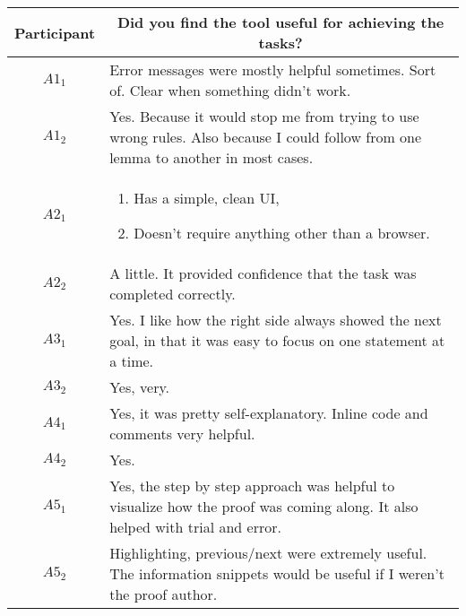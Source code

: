 \clearpage

\noindent
\begin{tabularx}{\linewidth}{@{}cX@{}}
  \toprule
  Participant & \multicolumn{1}{c}{
    \textbf{Did you find the tool useful for achieving the tasks?}
  } \\ \midrule
  $A1_{1}$ & Error messages were mostly helpful sometimes. Sort of. Clear when something didn't work. \\
  $A1_{2}$ & Yes.  Because it would stop me from trying to use wrong rules.  Also because I could follow from one lemma to another in most cases. \\
  $A2_{1}$ & \begin{enumerate} \item Has a simple, clean UI, \item Doesn't require anything other than a browser. \end{enumerate} \\
  $A2_{2}$ & A little.  It provided confidence that the task was completed correctly. \\
  $A3_{1}$ & Yes.  I like how the right side always showed the next goal, in that it was easy to focus on one statement at a time. \\
  $A3_{2}$ & Yes, very. \\
  $A4_{1}$ & Yes, it was pretty self-explanatory.  Inline code and comments very helpful. \\
  $A4_{2}$ & Yes. \\
  $A5_{1}$ & Yes, the step by step approach was helpful to visualize how the proof was coming along.  It also helped with trial and error. \\
  $A5_{2}$ & Highlighting, previous/next were extremely useful.  The information snippets would be useful if I weren't the proof author. \\
  \bottomrule
\end{tabularx}{\parfillskip=0pt\par}

\clearpage

